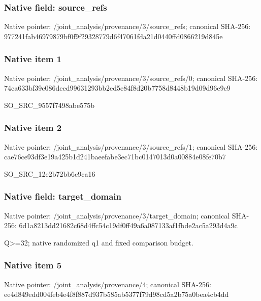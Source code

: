 \documentclass[10pt,a4paper]{article}
\begin{document}
\subsubsection{Native field: source\_refs}


Native pointer: /joint\_analysis/provenan\allowbreak{}ce/3/source\_refs; canonical SHA-256: 977241fab46979879bf0f9f2\allowbreak{}9328779d6f47061fda21d044\allowbreak{}0ffd0866219d845e



\subsubsection{Native item 1}


Native pointer: /joint\_analysis/provenan\allowbreak{}ce/3/source\_refs/0; canonical SHA-256: 74ca633bf39c086deed99631\allowbreak{}293bb2ed5e84f8d20b7758d8\allowbreak{}448b19d09d96e9c9


SO\_SRC\_9557f7498abe575b


\subsubsection{Native item 2}


Native pointer: /joint\_analysis/provenan\allowbreak{}ce/3/source\_refs/1; canonical SHA-256: cae76ce93df3e19a425b1d24\allowbreak{}1baeefabe3ec71bc0147013d\allowbreak{}0a00884e08fe70b7


SO\_SRC\_12e2b72bb6c9ca16


\subsubsection{Native field: target\_domain}


Native pointer: /joint\_analysis/provenan\allowbreak{}ce/3/target\_domain; canonical SHA-256: 6d1a8213dd21682c68d4ffc5\allowbreak{}4c19df0ff49a6a087133af1f\allowbreak{}bde2ac5a293d4a9c


Q>=32; native randomized q1 and fixed comparison budget.


\subsubsection{Native item 5}


Native pointer: /joint\_analysis/provenance/4; canonical SHA-256: ee4d849edd004feb4e4f8f88\allowbreak{}7d937b585ab5377f79d98cd5\allowbreak{}a2b75a0bea4cb4dd
\end{document}
